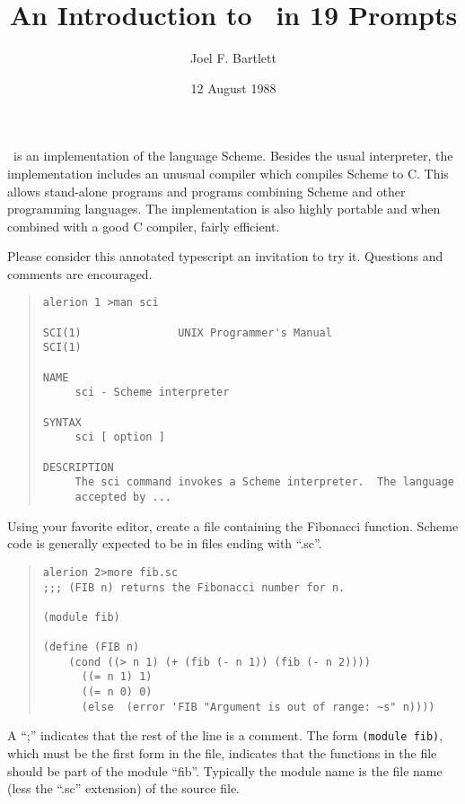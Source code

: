 \documentclass[11pt]{article}
\title{An Introduction to \StoC\ in 19 Prompts}
\author{Joel F. Bartlett}
\date{12 August 1988}
\begin{document}
\maketitle

\StoC\ is an implementation of the language Scheme.  Besides
the usual interpreter, the implementation includes an unusual
compiler which compiles Scheme to C.  This allows stand-alone
programs and programs combining Scheme and other programming
languages.  The implementation is also highly portable and when
combined with a good C compiler, fairly efficient.

Please consider this annotated typescript an invitation to try it.
Questions and comments are encouraged.

\begin{small}
\begin{quote}
\begin{verbatim}
alerion 1 >man sci

SCI(1)               UNIX Programmer's Manual                SCI(1)

NAME
     sci - Scheme interpreter

SYNTAX
     sci [ option ]

DESCRIPTION
     The sci command invokes a Scheme interpreter.  The language
     accepted by ...
\end{verbatim}
\end{quote}
\end{small}

Using your favorite editor, create a file containing the Fibonacci
function.  Scheme code is generally expected to be in files ending
with ``.sc''.

\begin{small}
\begin{quote}
\begin{verbatim}
alerion 2>more fib.sc
;;; (FIB n) returns the Fibonacci number for n.

(module fib)

(define (FIB n)
    (cond ((> n 1) (+ (fib (- n 1)) (fib (- n 2))))
	  ((= n 1) 1)
	  ((= n 0) 0)
	  (else  (error 'FIB "Argument is out of range: ~s" n))))
\end{verbatim}
\end{quote}
\end{small}

A ``;'' indicates that the rest of the line is a comment.  The form
\texttt{(module fib)}, which must be the first form in the file, indicates
that the functions in the file should be part of the module ``fib''.
Typically the module name is the file name (less the ``.sc'' extension)
of the source file.
\end{document}
